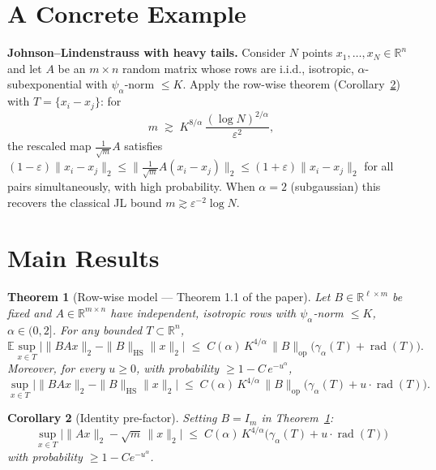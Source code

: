 \documentclass[11pt,a4paper]{article}
\newtheorem{theorem}{Theorem}
\newtheorem{corollary}[theorem]{Corollary}
\begin{document}
\section{A Concrete Example}

\textbf{Johnson--Lindenstrauss with heavy tails.}
Consider $N$ points $x_1,\dots,x_N\in\mathbb{R}^n$ and let $A$ be an $m\times n$ random matrix whose rows are i.i.d., isotropic, $\alpha$-subexponential with $\psi_\alpha$-norm $\le K$.
Apply the row-wise theorem (Corollary~\ref{cor:row}) with $T=\{x_i-x_j\}$:
for
\[
  m \;\gtrsim\; K^{8/\alpha}\,\frac{(\log N)^{2/\alpha}}{\varepsilon^2},
\]
the rescaled map $\frac{1}{\sqrt{m}}A$ satisfies $(1-\varepsilon)\|x_i-x_j\|_2\le \bigl\|\tfrac{1}{\sqrt{m}}A(x_i-x_j)\bigr\|_2\le (1+\varepsilon)\|x_i-x_j\|_2$ for all pairs simultaneously, with high probability.
When $\alpha=2$ (subgaussian) this recovers the classical JL bound $m\gtrsim \varepsilon^{-2}\log N$.

\section{Main Results}

\begin{theorem}[Row-wise model --- Theorem 1.1 of the paper]\label{thm:row}
Let $B\in\mathbb{R}^{\ell\times m}$ be fixed and $A\in\mathbb{R}^{m\times n}$ have independent, isotropic rows with $\psi_\alpha$-norm $\le K$, $\alpha\in(0,2]$. For any bounded $T\subset\mathbb{R}^n$,
\[
  \mathbb{E}\sup_{x\in T}\bigl|\|BAx\|_2 - \|B\|_{\mathrm{HS}}\|x\|_2\bigr|
  \;\le\; C(\alpha)\,K^{4/\alpha}\,\|B\|_{\mathrm{op}}\bigl(\gamma_\alpha(T)+\operatorname{rad}(T)\bigr).
\]
Moreover, for every $u\ge 0$, with probability $\ge 1-C\,e^{-u^\alpha}$,
\[
  \sup_{x\in T}\bigl|\|BAx\|_2 - \|B\|_{\mathrm{HS}}\|x\|_2\bigr|
  \;\le\; C(\alpha)\,K^{4/\alpha}\,\|B\|_{\mathrm{op}}\bigl(\gamma_\alpha(T)+u\cdot\operatorname{rad}(T)\bigr).
\]
\end{theorem}

\begin{corollary}[Identity pre-factor]\label{cor:row}
Setting $B=I_m$ in Theorem~\ref{thm:row}:
\[
  \sup_{x\in T}\bigl|\|Ax\|_2-\sqrt{m}\,\|x\|_2\bigr|
  \;\le\; C(\alpha)\,K^{4/\alpha}\bigl(\gamma_\alpha(T)+u\cdot\operatorname{rad}(T)\bigr)
\]
with probability $\ge 1-Ce^{-u^\alpha}$.
\end{corollary}
\end{document}
